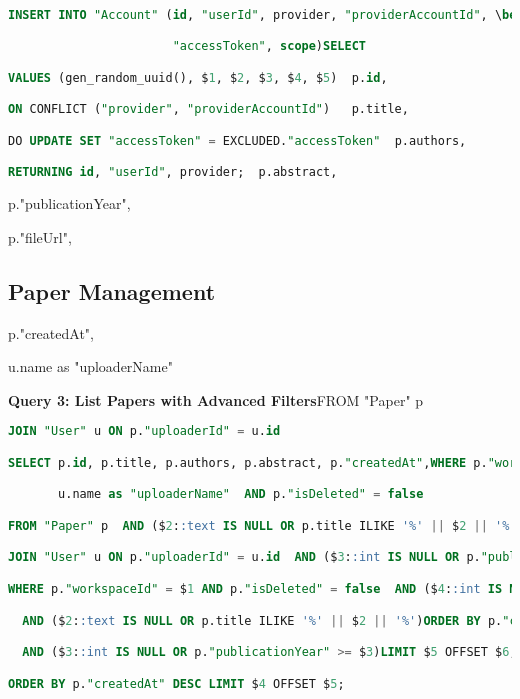 \begin{lstlisting}[language=SQL,basicstyle=\tiny\ttfamily]

INSERT INTO "Account" (id, "userId", provider, "providerAccountId", \begin{lstlisting}[language=SQL, caption={List Papers with Pagination \& Filters}]

                       "accessToken", scope)SELECT 

VALUES (gen_random_uuid(), $1, $2, $3, $4, $5)  p.id,

ON CONFLICT ("provider", "providerAccountId")   p.title,

DO UPDATE SET "accessToken" = EXCLUDED."accessToken"  p.authors,

RETURNING id, "userId", provider;  p.abstract,

\end{lstlisting}  p."publicationYear",

  p."fileUrl",

\subsection{Paper Management}  p."createdAt",

  u.name as "uploaderName"

\textbf{Query 3: List Papers with Advanced Filters}FROM "Paper" p

\begin{lstlisting}[language=SQL,basicstyle=\tiny\ttfamily]JOIN "User" u ON p."uploaderId" = u.id

SELECT p.id, p.title, p.authors, p.abstract, p."createdAt",WHERE p."workspaceId" = $1

       u.name as "uploaderName"  AND p."isDeleted" = false

FROM "Paper" p  AND ($2::text IS NULL OR p.title ILIKE '%' || $2 || '%')

JOIN "User" u ON p."uploaderId" = u.id  AND ($3::int IS NULL OR p."publicationYear" >= $3)

WHERE p."workspaceId" = $1 AND p."isDeleted" = false  AND ($4::int IS NULL OR p."publicationYear" <= $4)

  AND ($2::text IS NULL OR p.title ILIKE '%' || $2 || '%')ORDER BY p."createdAt" DESC

  AND ($3::int IS NULL OR p."publicationYear" >= $3)LIMIT $5 OFFSET $6;

ORDER BY p."createdAt" DESC LIMIT $4 OFFSET $5;\end{lstlisting}

